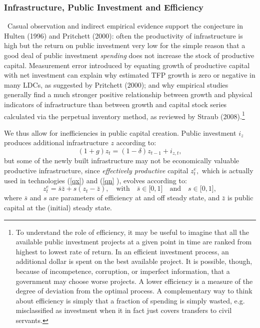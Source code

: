 \documentclass[11pt]{article}
\begin{document}
\subsubsection{Infrastructure, Public Investment and Efficiency}

\quad\ \thinspace Casual observation and indirect empirical evidence support
the conjecture in Hulten (1996) and Pritchett (2000): often the productivity
of infrastructure is high but the return on public investment very low for
the simple reason that a good deal of public investment \textit{spending}
does not increase the stock of productive capital. Measurement error
introduced by equating growth of productive capital with net investment can
explain why estimated TFP growth is zero or negative in many LDCs, as
suggested by Pritchett (2000); and why empirical studies generally find a
much stronger positive relationship between growth and physical indicators
of infrastructure than between growth and capital stock series calculated
via the perpetual inventory method, as reviewed by Straub (2008).\footnote{%
\baselineskip=12pt To understand the role of efficiency, it may be useful to
imagine that all the available public investment projects at a given point
in time are ranked from highest to lowest rate of return. In an efficient
investment process, an additional dollar is spent on the best available
project. It is possible, though, because of incompetence, corruption, or
imperfect information, that a government may choose worse projects. A lower
efficiency is a measure of the degree of deviation from the optimal process.
A complementary way to think about efficiency is simply that a fraction of
spending is simply wasted, e.g. misclassified as investment when it in fact
just covers transfers to civil servants.}

We thus allow for inefficiencies in public capital creation. Public
investment $i_{z}$ produces additional infrastructure $z$ according to:%
\begin{equation}
(1+g)z_{t}=(1-\delta )z_{t-1}+i_{z,t},  \label{z_accum}
\end{equation}%
but some of the newly built infrastructure may not be economically valuable
productive infrastructure, since \textit{effectively productive} capital $%
z_{t}^{e},$ which is actually used in technologies (\ref{qx}) and (\ref{qn}%
), evolves according to: 
\begin{equation}
z_{t}^{e}=\bar{s}\bar{z}+s(z_{t}-\bar{z}),\quad \text{with}\quad \bar{s}\in
\lbrack 0,1]\quad \text{and}\quad s\in \lbrack 0,1],  \label{z efficiency}
\end{equation}%
where $\bar{s}$ and $s$ are parameters of efficiency at and off steady
state, and $\bar{z}$ is public capital at the (initial) steady state.
\end{document}
